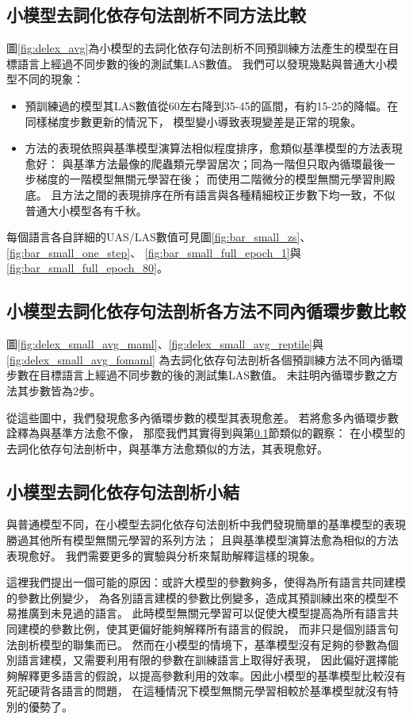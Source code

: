 \subsection{小模型去詞化依存句法剖析不同方法比較}
\label{subsec:result_small_delex_parsing}

圖\ref{fig:delex_avg}為小模型的去詞化依存句法剖析不同預訓練方法產生的模型在目標語言上經過不同步數的\finetune 後的測試集LAS數值。
我們可以發現幾點與普通大小模型不同的現象：
\begin{itemize}
    \item 預訓練過的模型其LAS數值從60左右降到35-45的區間，有約15-25的降幅。在同樣梯度步數更新的情況下，
    模型變小導致表現變差是正常的現象。
    \item 方法的表現依照與基準模型演算法相似程度排序，愈類似基準模型的方法表現愈好：
與基準方法最像的爬蟲類元學習居次；同為一階但只取內循環最後一步梯度的一階模型無關元學習在後；
而使用二階微分的模型無關元學習則殿底。
且方法之間的表現排序在所有語言與各種精細校正步數下均一致，不似普通大小模型各有千秋。
\end{itemize}
每個語言各自詳細的UAS/LAS數值可見圖\ref{fig:bar_small_zs}、\ref{fig:bar_small_one_step}、
\ref{fig:bar_small_full_epoch_1}與\ref{fig:bar_small_full_epoch_80}。
\subsection{小模型去詞化依存句法剖析各方法不同內循環步數比較}

圖\ref{fig:delex_small_avg_maml}、\ref{fig:delex_small_avg_reptile}與\ref{fig:delex_small_avg_fomaml}
為去詞化依存句法剖析各個預訓練方法不同內循環步數在目標語言上經過不同步數的\finetune 後的測試集LAS數值。
未註明內循環步數之方法其步數皆為2步。

從這些圖中，我們發現愈多內循環步數的模型其表現愈差。
若將愈多內循環步數詮釋為與基準方法愈不像，
那麼我們其實得到與第\ref{subsec:result_small_delex_parsing}節類似的觀察：
在小模型的去詞化依存句法剖析中，與基準方法愈類似的方法，其表現愈好。

\subsection{小模型去詞化依存句法剖析小結}
與普通模型不同，在小模型去詞化依存句法剖析中我們發現簡單的基準模型的表現勝過其他所有模型無關元學習的系列方法；
且與基準模型演算法愈為相似的方法表現愈好。
我們需要更多的實驗與分析來幫助解釋這樣的現象。

這裡我們提出一個可能的原因：或許大模型的參數夠多，使得為所有語言共同建模的參數比例變少，
為各別語言建模的參數比例變多，造成其預訓練出來的模型不易推廣到未見過的語言。
此時模型無關元學習可以促使大模型提高為所有語言共同建模的參數比例，使其更偏好能夠解釋所有語言的假說，
而非只是個別語言句法剖析模型的聯集而已。
然而在小模型的情境下，基準模型沒有足夠的參數為個別語言建模，又需要利用有限的參數在訓練語言上取得好表現，
因此偏好選擇能夠解釋更多語言的假說，以提高參數利用的效率。因此小模型的基準模型比較沒有死記硬背各語言的問題，
在這種情況下模型無關元學習相較於基準模型就沒有特別的優勢了。

